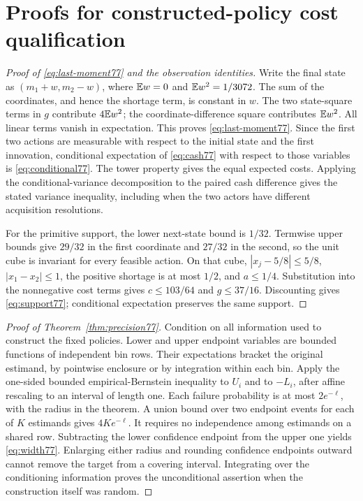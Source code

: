 \section{Proofs for constructed-policy cost qualification}\label{supp:proofs77}
\begin{proof}[Proof of \eqref{eq:last-moment77} and the observation identities]
Write the final state as $(m_1+w,m_2-w)$, where $\mathbb E w=0$ and $\mathbb E w^2=1/3072$. The sum of the coordinates, and hence the shortage term, is constant in $w$. The two state-square terms in $g$ contribute $4\mathbb E w^2$; the coordinate-difference square contributes $\mathbb E w^2$. All linear terms vanish in expectation. This proves \eqref{eq:last-moment77}. Since the first two actions are measurable with respect to the initial state and the first innovation, conditional expectation of \eqref{eq:cash77} with respect to those variables is \eqref{eq:conditional77}. The tower property gives the equal expected costs. Applying the conditional-variance decomposition to the paired cash difference gives the stated variance inequality, including when the two actors have different acquisition resolutions.

For the primitive support, the lower next-state bound is $1/32$. Termwise upper bounds give $29/32$ in the first coordinate and $27/32$ in the second, so the unit cube is invariant for every feasible action. On that cube, $|x_j-5/8|\le5/8$, $|x_1-x_2|\le1$, the positive shortage is at most $1/2$, and $a\le1/4$. Substitution into the nonnegative cost terms gives $c\le103/64$ and $g\le37/16$. Discounting gives \eqref{eq:support77}; conditional expectation preserves the same support.
\end{proof}

\begin{proof}[Proof of Theorem~\ref{thm:precision77}]
Condition on all information used to construct the fixed policies. Lower and upper endpoint variables are bounded functions of independent bin rows. Their expectations bracket the original estimand, by pointwise enclosure or by integration within each bin. Apply the one-sided bounded empirical-Bernstein inequality to $U_i$ and to $-L_i$, after affine rescaling to an interval of length one. Each failure probability is at most $2e^{-\ell}$, with the radius in the theorem. A union bound over two endpoint events for each of $K$ estimands gives $4K e^{-\ell}$. It requires no independence among estimands on a shared row. Subtracting the lower confidence endpoint from the upper one yields \eqref{eq:width77}. Enlarging either radius and rounding confidence endpoints outward cannot remove the target from a covering interval. Integrating over the conditioning information proves the unconditional assertion when the construction itself was random.
\end{proof}

